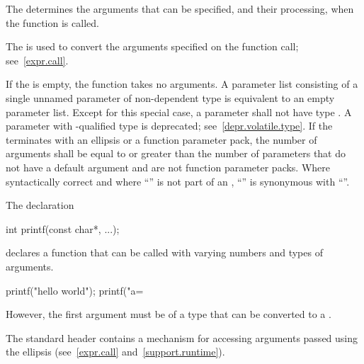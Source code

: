 \pnum
{}%
The
determines the arguments that can be specified, and their processing, when the function is called.
\begin{note}
%
The
is used to convert the arguments specified on the function call;
see~\ref{expr.call}.
\end{note}
%
If the
is empty, the function takes no arguments.
A parameter list consisting of a single unnamed parameter of
non-dependent type  is equivalent to an empty parameter
list.
%
Except for this special case, a parameter shall not have type 
.
A parameter with -qualified type is deprecated;
see~\ref{depr.volatile.type}.
If the
%
%
%
%
%
terminates with an ellipsis or a function parameter
pack, the number of arguments shall be equal
to or greater than the number of parameters that do not have a default
argument and are not function parameter packs.
Where syntactically correct and where ``'' is not
part of an ,
``''
is synonymous with
``''.
\begin{example}
The declaration
\begin{codeblock}
int printf(const char*, ...);
\end{codeblock}
declares a function that can be called with varying numbers and types of arguments.

\begin{codeblock}
printf("hello world");
printf("a=%
\end{codeblock}

However, the first argument must be of a type
that can be converted to a
.
\end{example}
\begin{note}
The standard header 
contains a mechanism for accessing arguments passed using the ellipsis
(see~\ref{expr.call} and~\ref{support.runtime}).
\end{note}

